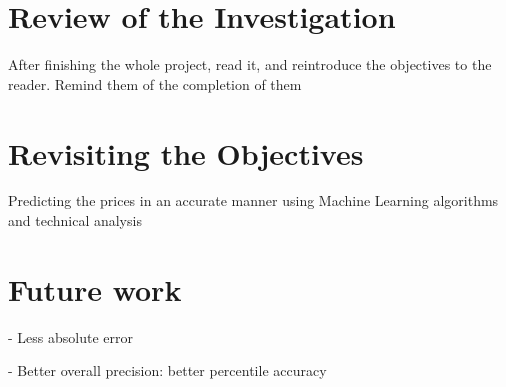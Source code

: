 \documentclass[12pt]{report} %
\begin{document}
\section{Review of the Investigation} %
After finishing the whole project, read it, and reintroduce the objectives to the reader. Remind them of the completion of them

\section{Revisiting the Objectives}
Predicting the prices in an accurate manner using Machine Learning algorithms and technical analysis

\section{Future work}
- Less absolute error

- Better overall precision: better percentile accuracy




\clearpage
{}

\printbibliography




\end{document}
